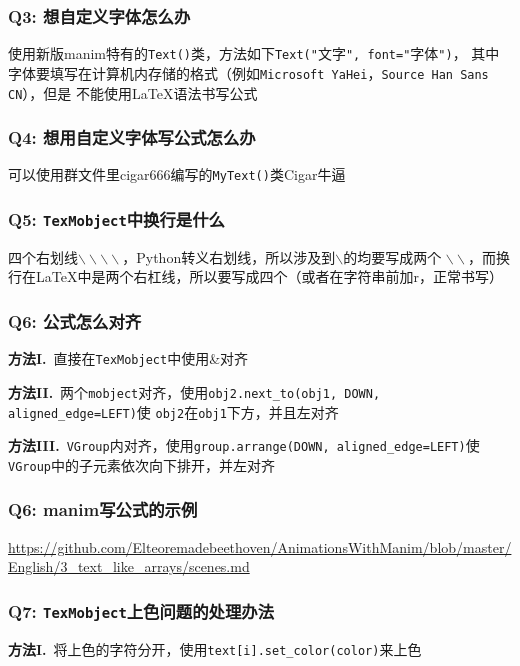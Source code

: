 \documentclass[UTF8]{ctexart}
\begin{document}
\subsubsection*{Q3: 想自定义字体怎么办}
使用新版manim特有的\texttt{Text()}类，方法如下\texttt{Text("}文字\texttt{", font="}字体\texttt{")}，
其中字体要填写在计算机内存储的格式（例如\texttt{Microsoft YaHei}，\texttt{Source Han Sans CN}），但是
不能使用\LaTeX 语法书写公式

\subsubsection*{Q4: 想用自定义字体写公式怎么办}
可以使用群文件里cigar666编写的\texttt{MyText()}类{\tiny Cigar牛逼}

\subsubsection*{Q5: \texttt{TexMobject}中换行是什么}
四个右划线$\backslash\backslash\backslash\backslash$，Python转义右划线，所以涉及到$\backslash$的均要写成两个
$\backslash\backslash$，而换行在\LaTeX 中是两个右杠线，所以要写成四个（或者在字符串前加r，正常书写）

\subsubsection*{Q6: 公式怎么对齐}
\textbf{方法I.}\ 直接在\texttt{TexMobject}中使用\&对齐

\textbf{方法II.}\ 两个\texttt{mobject}对齐，使用\texttt{obj2.next\_to(obj1, DOWN, aligned\_edge=LEFT)}使
\texttt{obj2}在\texttt{obj1}下方，并且左对齐

\textbf{方法III.}\ \texttt{VGroup}内对齐，使用\texttt{group.arrange(DOWN, aligned\_edge=LEFT)}使
\texttt{VGroup}中的子元素依次向下排开，并左对齐

\subsubsection*{Q6: manim写公式的示例}
\url{https://github.com/Elteoremadebeethoven/AnimationsWithManim/blob/master/English/3\_text\_like\_arrays/scenes.md}

\subsubsection*{Q7: \texttt{TexMobject}上色问题的处理办法}
\textbf{方法I.}\ 将上色的字符分开，使用\texttt{text[i].set\_color(color)}来上色
\end{document}
